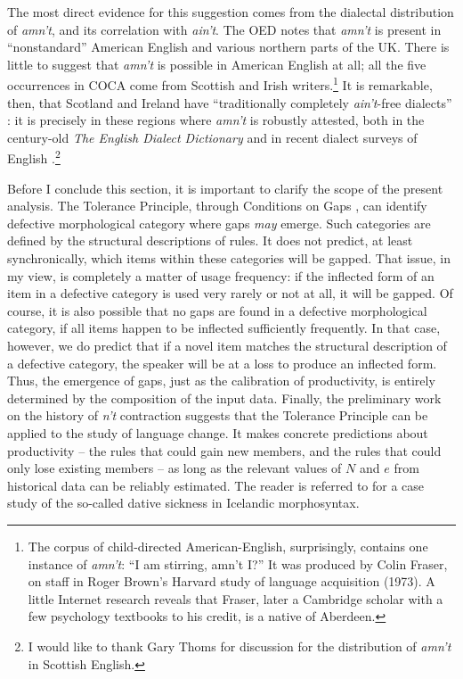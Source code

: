 \documentclass[output=paper,
modfonts
]{LSP/langsci}
\begin{document}
The most direct evidence for this suggestion comes from the 
dialectal distribution of \textit{amn't}, and its correlation with \textit{ain't}. 
The OED notes that \textit{amn't} is present in ``nonstandard'' American English and various northern
parts of the UK. There is little to suggest that \textit{amn't} is
possible in American English at all;  all the five occurrences in COCA
come from Scottish and Irish writers.\footnote{ The corpus of child-directed
American-English,  surprisingly, contains one instance 
of \textit{amn't}: ``I am stirring, amn't I?'' It was produced by Colin Fraser,
on staff in Roger Brown's Harvard study of language acquisition
(1973). A little Internet research reveals that Fraser, later a
Cambridge scholar with a few psychology textbooks to his credit, is a
native of Aberdeen.} It is 
remarkable, then,  that 
 Scotland and Ireland have ``traditionally completely \textit{ain't}-free dialects'' \citep[][p520]{Anderwald2003a}: it is
precisely in these regions where \textit{amn't} is robustly attested,
both in the century-old \textit{The English
  Dialect Dictionary} \citep{Wright1898} and in recent dialect
surveys of English \citep{Anderwald2003}.\footnote{I would like to thank Gary Thoms for
  discussion for the distribution of \textit{amn't} in Scottish English.}


Before I conclude this section, it is important to clarify the scope of the present
analysis. The Tolerance Principle, through  Conditions on
Gaps , can identify defective morphological
category where gaps \textit{may} emerge. Such categories are defined 
 by the structural descriptions of rules. It does not predict, at
 least synchronically, 
which items within these categories will be gapped. That issue,  in my view,
is completely a matter of usage frequency: if the inflected form of an
item in a defective category is used very  rarely or not at all, it will be gapped.  Of
course, it is also possible that no gaps are found in a defective
morphological category, if 
all items happen to be inflected sufficiently frequently. In that
case, however, we do predict that if a novel item 
 matches the structural description of a defective category, the speaker
will be at a loss to produce an inflected form.  Thus, the emergence
of gaps, just as the calibration of productivity,  is entirely
determined by the composition of the input data. 
Finally, the preliminary work on the history of \textit{n't} contraction
suggests that the Tolerance 
Principle can be applied to the study of language change. It makes
concrete predictions about productivity -- the rules that could 
gain new members, and the rules that could  only lose existing
members -- as long as the relevant values of $N$ and $e$ from
historical data can be reliably estimated. The reader is referred to
\citealt{POP} for a case study of  the so-called
  dative sickness in Icelandic morphosyntax.
\end{document}
